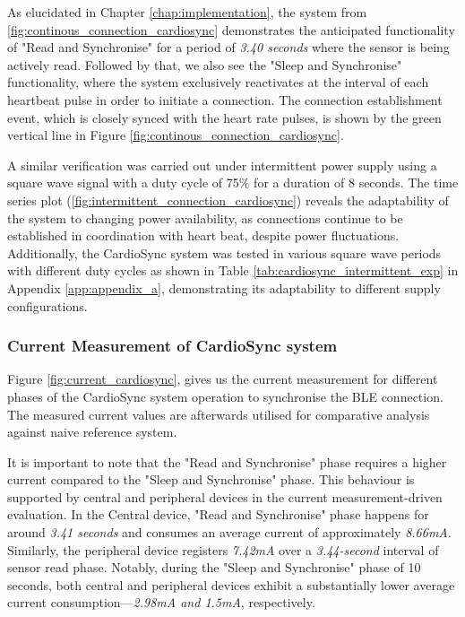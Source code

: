 \noindent As elucidated in Chapter \ref{chap:implementation}, the system from \autoref{fig:continous_connection_cardiosync} demonstrates the anticipated functionality of "Read and Synchronise" for a period of \textit{3.40 seconds} where the sensor is being actively read. Followed by that, we also see  the "Sleep and Synchronise" functionality, where the system exclusively reactivates at the interval of each heartbeat pulse in order to initiate a connection. The connection establishment event, which is closely synced with the heart rate pulses, is shown by the green vertical line in Figure \ref{fig:continous_connection_cardiosync}.
\vspace{1\baselineskip}

\noindent A similar verification was carried out under intermittent power supply using a square wave signal with a duty cycle of 75\% for a duration of 8 seconds. The time series plot (\autoref{fig:intermittent_connection_cardiosync}) reveals the adaptability of the system to changing power availability, as connections continue to be established in coordination with heart beat, despite power fluctuations. Additionally, the CardioSync system was tested in various square wave periods with different duty cycles as shown in Table \ref{tab:cardiosync_intermittent_exp} in Appendix \ref{app:appendix_a}, demonstrating its adaptability to different supply configurations.

\subsubsection{Current Measurement of CardioSync system}
Figure \ref{fig:current_cardiosync}, gives us the current measurement for different phases of the CardioSync system operation to synchronise the BLE connection. The measured current values are afterwards utilised for comparative analysis against naive reference system.
\vspace{1\baselineskip}

\noindent It is important to note that the "Read and Synchronise" phase requires a higher current compared to the "Sleep and Synchronise" phase. This behaviour is supported by central and peripheral devices in the current measurement-driven evaluation. In the Central device, "Read and Synchronise" phase happens for around \textit{3.41 seconds} and consumes an average current of approximately \textit{8.66mA}. Similarly, the peripheral device registers \textit{7.42mA} over a \textit{3.44-second} interval of sensor read phase. Notably, during the "Sleep and Synchronise" phase of 10 seconds, both central and peripheral devices exhibit a substantially lower average current consumption—\textit{2.98mA and 1.5mA}, respectively.
\vspace{1\baselineskip}

